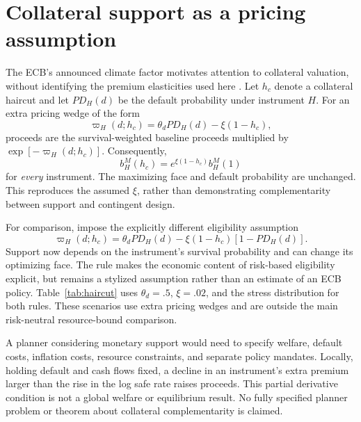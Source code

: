 \documentclass[11pt]{article}
\newcommand{\FitTable}[1]{\sbox{\tablebox}{#1}\ifdim\wd\tablebox>\linewidth\resizebox{\linewidth}{!}{\usebox{\tablebox}}\else\usebox{\tablebox}\fi}
\begin{document}
\section{Collateral support as a pricing assumption}\label{app:monetary}
The ECB's announced climate factor motivates attention to collateral valuation, without identifying the premium elasticities used here \parencite{ecb2025_climate_factor_pr}. Let $h_c$ denote a collateral haircut and let $PD_H(d)$ be the default probability under instrument $H$. For an extra pricing wedge of the form
\begin{equation}\label{eq:collateral}
 \varpi_H(d;h_c)=\theta_dPD_H(d)-\xi(1-h_c),
\end{equation}
proceeds are the survival-weighted baseline proceeds multiplied by $\exp[-\varpi_H(d;h_c)]$. Consequently,
\begin{equation}\label{eq:mechanical}
 b_H^M(h_c)=e^{\xi(1-h_c)}b_H^M(1)
\end{equation}
for \emph{every} instrument. The maximizing face and default probability are unchanged. This reproduces the assumed $\xi$, rather than demonstrating complementarity between support and contingent design.

For comparison, impose the explicitly different eligibility assumption
\begin{equation}\label{eq:riskeligibility}
 \varpi_H(d;h_c)=\theta_dPD_H(d)-\xi(1-h_c)[1-PD_H(d)].
\end{equation}
Support now depends on the instrument's survival probability and can change its optimizing face. The rule makes the economic content of risk-based eligibility explicit, but remains a stylized assumption rather than an estimate of an ECB policy. Table~\ref{tab:haircut} uses $\theta_d=.5$, $\xi=.02$, and the stress distribution for both rules. These scenarios use extra pricing wedges and are outside the main risk-neutral resource-bound comparison.
\begin{table}[h]
\centering\caption{Collateral easing relative to ineligibility within each instrument, under common additive and risk-dependent eligibility. The additional PD loading is an assumed premium beyond expected default losses.}\label{tab:haircut}
\FitTable{}
\end{table}
A planner considering monetary support would need to specify welfare, default costs, inflation costs, resource constraints, and separate policy mandates. Locally, holding default and cash flows fixed, a decline in an instrument's extra premium larger than the rise in the log safe rate raises proceeds. This partial derivative condition is not a global welfare or equilibrium result. No fully specified planner problem or theorem about collateral complementarity is claimed.
\end{document}
